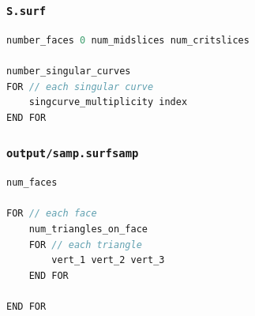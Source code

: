 \subsubsection{\tt S.surf}
\label{sec:s.surf}

\begin{center}\begin{minipage}{0.9\linewidth}
\begin{lstlisting}[language=c++, caption={\tt output/S.surf}, captionpos=b]
number_faces 0 num_midslices num_critslices

number_singular_curves
FOR // each singular curve
	singcurve_multiplicity index
END FOR
\end{lstlisting}
\end{minipage}\end{center}



\subsubsection{\tt output/samp.surfsamp}
\label{sec:samp.surfsamp}



\begin{center}\begin{minipage}{0.9\linewidth}
\begin{lstlisting}[language=c++, caption={\tt output/samp.surfsamp}, captionpos=b]
num_faces

FOR // each face
	num_triangles_on_face
	FOR // each triangle
		vert_1 vert_2 vert_3
	END FOR
	
END FOR
\end{lstlisting}
\end{minipage}\end{center}


